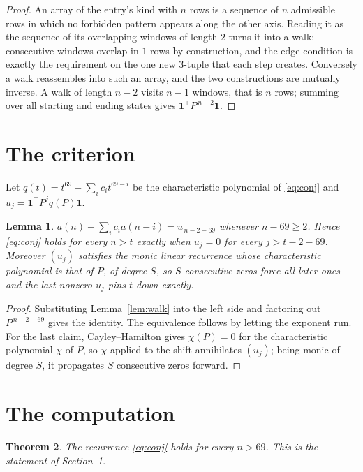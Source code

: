 \documentclass[11pt,a4paper]{article}
\theoremstyle{plain}
\newtheorem{theorem}{Theorem}
\newtheorem{lemma}[theorem]{Lemma}
\theoremstyle{definition}
\begin{document}
\begin{proof}
An array of the entry's kind with $n$ rows is a sequence of $n$ admissible rows in
which no forbidden pattern appears along the other axis. Reading it as the sequence of its
overlapping windows of length $2$ turns it into a walk: consecutive windows overlap in
$1$ rows by construction, and the edge condition is exactly the requirement on the one
new $3$-tuple that each step creates. Conversely a walk reassembles into such an array,
and the two constructions are mutually inverse. A walk of length $n-2$ visits $n-1$
windows, that is $n$ rows; summing over all starting and ending states gives
$\mathbf{1}^{\!\top}P^{\,n-2}\mathbf{1}$.
\end{proof}

\section{The criterion}

Let $q(t)=t^{69}-\sum_i c_i t^{69-i}$ be the characteristic polynomial of
\eqref{eq:conj} and $u_j=\mathbf{1}^{\!\top}P^{j}q(P)\mathbf{1}$.

\begin{lemma}\label{lem:crit}
$a(n)-\sum_i c_i a(n-i)=u_{\,n-2-69}$ whenever $n-69\ge2$. Hence
\eqref{eq:conj} holds for every $n>t$ exactly when $u_j=0$ for every
$j>t-2-69$. Moreover $(u_j)$ satisfies the monic linear recurrence whose
characteristic polynomial is that of $P$, of degree $S$, so $S$ consecutive zeros force all
later ones and the last nonzero $u_j$ pins $t$ down exactly.
\end{lemma}

\begin{proof}
Substituting Lemma~\ref{lem:walk} into the left side and factoring out
$P^{\,n-2-69}$ gives the identity. The equivalence follows by letting the exponent
run. For the last claim, Cayley--Hamilton gives $\chi(P)=0$ for the characteristic
polynomial $\chi$ of $P$, so $\chi$ applied to the shift annihilates $(u_j)$; being monic of
degree $S$, it propagates $S$ consecutive zeros forward.
\end{proof}

\section{The computation}

\begin{theorem}
The recurrence \eqref{eq:conj} holds for every $n>69$. This is the statement of
Section~1.
\end{theorem}
\end{document}
